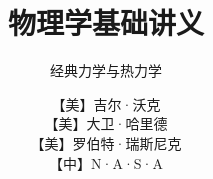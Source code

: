 \documentclass[themecolor=colorful,openany]{textbook-cn}%
\title{物理学基础讲义}
\subtitle{经典力学与热力学}
\author{【美】吉尔·沃克\\【美】大卫·哈里德\\【美】罗伯特·瑞斯尼克\\【中】N·A·S·A}
\begin{document}
\MainFont

\makecover
\maketitle

\frontmatter




\shorttableofcontents
\tableofcontents

%
\mainmatter

%	
%	
%	
%	
%		
%		
%
\end{document}
